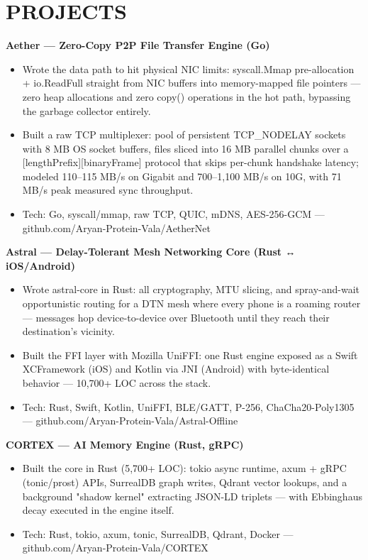 \documentclass[9pt]{article}
\begin{document}
\section*{PROJECTS}
\textbf{Aether  ---  Zero-Copy P2P File Transfer Engine (Go)}
\vspace{1pt}
\begin{itemize}[leftmargin=11pt,itemsep=0pt,topsep=1pt,parsep=0pt]
\item Wrote the data path to hit physical NIC limits: syscall.Mmap pre-allocation + io.ReadFull straight from NIC buffers into memory-mapped file pointers  ---  zero heap allocations and zero copy() operations in the hot path, bypassing the garbage collector entirely.
\item Built a raw TCP multiplexer: pool of persistent TCP\_NODELAY sockets with 8 MB OS socket buffers, files sliced into 16 MB parallel chunks over a [lengthPrefix][binaryFrame] protocol that skips per-chunk handshake latency; modeled 110–115 MB/s on Gigabit and 700–1,100 MB/s on 10G, with 71 MB/s peak measured sync throughput.
\item Tech: Go, syscall/mmap, raw TCP, QUIC, mDNS, AES-256-GCM  ---  github.com/Aryan-Protein-Vala/AetherNet
\end{itemize}
\textbf{Astral  ---  Delay-Tolerant Mesh Networking Core (Rust ↔ iOS/Android)}
\vspace{1pt}
\begin{itemize}[leftmargin=11pt,itemsep=0pt,topsep=1pt,parsep=0pt]
\item Wrote astral-core in Rust: all cryptography, MTU slicing, and spray-and-wait opportunistic routing for a DTN mesh where every phone is a roaming router  ---  messages hop device-to-device over Bluetooth until they reach their destination's vicinity.
\item Built the FFI layer with Mozilla UniFFI: one Rust engine exposed as a Swift XCFramework (iOS) and Kotlin via JNI (Android) with byte-identical behavior  ---  10,700+ LOC across the stack.
\item Tech: Rust, Swift, Kotlin, UniFFI, BLE/GATT, P-256, ChaCha20-Poly1305  ---  github.com/Aryan-Protein-Vala/Astral-Offline
\end{itemize}
\textbf{CORTEX  ---  AI Memory Engine (Rust, gRPC)}
\vspace{1pt}
\begin{itemize}[leftmargin=11pt,itemsep=0pt,topsep=1pt,parsep=0pt]
\item Built the core in Rust (5,700+ LOC): tokio async runtime, axum + gRPC (tonic/prost) APIs, SurrealDB graph writes, Qdrant vector lookups, and a background "shadow kernel" extracting JSON-LD triplets  ---  with Ebbinghaus decay executed in the engine itself.
\item Tech: Rust, tokio, axum, tonic, SurrealDB, Qdrant, Docker  ---  github.com/Aryan-Protein-Vala/CORTEX
\end{itemize}
\end{document}
